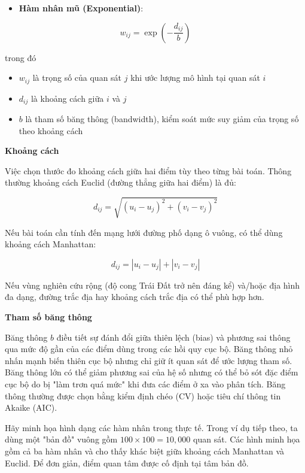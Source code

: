 \begin{itemize}
\item
  \textbf{Hàm nhân mũ (Exponential)}:
\end{itemize}

\[
w_{ij} = \exp \left ( -\frac{d_{ij}}{b} \right )
\]

trong đó

\begin{itemize}
\item
  \(w_{ij}\) là trọng số của quan sát \(j\) khi ước lượng mô hình tại quan sát \(i\)
\item
  \(d_{ij}\) là khoảng cách giữa \(i\) và \(j\)
\item
  \(b\) là tham số băng thông (bandwidth), kiểm soát mức suy giảm của trọng số theo khoảng cách
\end{itemize}

\textbf{Khoảng cách}

Việc chọn thước đo khoảng cách giữa hai điểm tùy theo từng bài toán. Thông thường khoảng cách Euclid (đường thẳng giữa hai điểm) là đủ:

\[
d_{ij} = \sqrt{(u_{i} - u_{j})^{2} + (v_{i} - v_{j})^{2}}
\]

Nếu bài toán cần tính đến mạng lưới đường phố dạng ô vuông, có thể dùng khoảng cách Manhattan:

\[
d_{ij} = |u_{i} - u_{j}| + |v_{i} - v_{j}|
\]

Nếu vùng nghiên cứu rộng (độ cong Trái Đất trở nên đáng kể) và/hoặc địa hình đa dạng, đường trắc địa hay khoảng cách trắc địa có thể phù hợp hơn.

\textbf{Tham số băng thông}

Băng thông \(b\) điều tiết sự đánh đổi giữa thiên lệch (bias) và phương sai thông qua mức độ gần của các điểm dùng trong các hồi quy cục bộ. Băng thông nhỏ nhấn mạnh biến thiên cục bộ nhưng chỉ giữ ít quan sát để ước lượng tham số. Băng thông lớn có thể giảm phương sai của hệ số nhưng có thể bỏ sót đặc điểm cục bộ do bị "làm trơn quá mức" khi đưa các điểm ở xa vào phân tích. Băng thông thường được chọn bằng kiểm định chéo (CV) hoặc tiêu chí thông tin Akaike (AIC).

Hãy minh họa hình dạng các hàm nhân trong thực tế. Trong ví dụ tiếp theo, ta dùng một "bản đồ" vuông gồm \(100 \times 100 = 10,000\) quan sát. Các hình minh họa gồm cả ba hàm nhân và cho thấy khác biệt giữa khoảng cách Manhattan và Euclid. Để đơn giản, điểm quan tâm được cố định tại tâm bản đồ.

